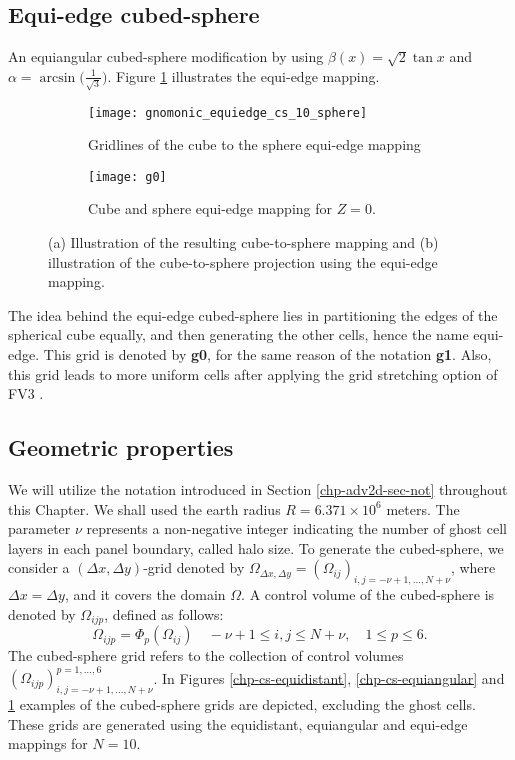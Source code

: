 \subsection{Equi-edge cubed-sphere}
\label{cs-equiedge}
An equiangular cubed-sphere modification 
\citet{chen:2021} by using $\beta(x) = \sqrt{2}\tan{x}$ and
$\alpha=\arcsin{\big(\frac{1}{\sqrt{3}}\big)}$.
Figure \ref{chp-cs-equiedge} illustrates the equi-edge mapping.
\begin{figure}[!htb]
	\centering
	\begin{subfigure}{0.42\textwidth}
		\texttt{[image: gnomonic\_equiedge\_cs\_10\_sphere]}
		\caption{Gridlines of the cube to the sphere equi-edge mapping}
	\end{subfigure}
	\begin{subfigure}{0.42\textwidth}
		\centering
		\texttt{[image: g0]}
		\caption{Cube and sphere equi-edge mapping for $Z=0$.}
	\end{subfigure}
	\caption{(a) Illustration of the resulting cube-to-sphere mapping and (b) illustration of the cube-to-sphere projection using the equi-edge mapping.\label{chp-cs-equiedge}}
\end{figure}

The idea behind the equi-edge cubed-sphere lies in partitioning the edges of the spherical cube equally,
and then generating the other cells, hence the name equi-edge.
This grid is denoted by \textbf{g0}, for the same reason of the notation \textbf{g1}.
Also, this grid leads to more uniform cells after applying the grid stretching option of FV3 \citep{harris:2016, chen:2021}.

\subsection{Geometric properties}
We will utilize the notation introduced in Section \ref{chp-adv2d-sec-not} throughout this Chapter.
We shall used the earth radius $R = 6.371 \times 10^6$ meters.
The parameter $\nu$ represents a non-negative integer indicating the number of ghost cell layers in each panel boundary, called halo size.
To generate the cubed-sphere, we consider a $(\Delta x, \Delta y)$-grid denoted by 
$\Omega_{\Delta x, \Delta y} = (\Omega_{ij})_{i,j=-\nu+1,\ldots,N+\nu}$, 
where $\Delta x = \Delta y$, and it covers the domain $\Omega$. 
A control volume of the cubed-sphere is denoted by $\Omega_{ijp}$, defined as follows:
\begin{equation*}
	\Omega_{ijp} = \Phi_p(\Omega_{ij})
	\quad -\nu+1 \leq i, j \leq N+\nu, \quad 1 \leq p \leq 6.
\end{equation*}
The cubed-sphere grid refers to the collection of control volumes 
$(\Omega_{ijp})_{i,j=-\nu+1,\ldots,N+\nu}^{p=1,\ldots,6}$. 
In Figures \ref{chp-cs-equidistant}, \ref{chp-cs-equiangular} and \ref{chp-cs-equiedge} examples of the cubed-sphere grids are depicted,
excluding the ghost cells.
These grids are generated using the equidistant, equiangular and equi-edge mappings for $N=10$.

